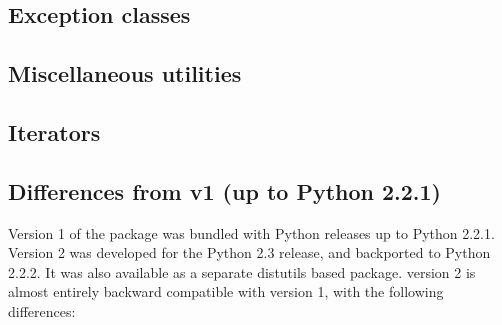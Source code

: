 \subsection{Exception classes}


\subsection{Miscellaneous utilities}


\subsection{Iterators}


\subsection{Differences from  v1 (up to Python 2.2.1)}

Version 1 of the  package was bundled with Python
releases up to Python 2.2.1.  Version 2 was developed for the Python
2.3 release, and backported to Python 2.2.2.  It was also available as
a separate distutils based package.   version 2 is
almost entirely backward compatible with version 1, with the
following differences:

